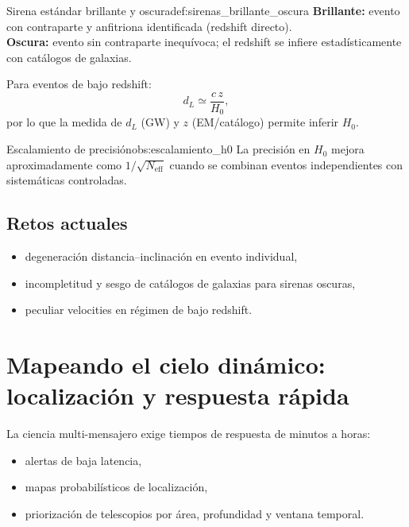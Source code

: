 \begin{definicion}{Sirena estándar brillante y oscura}{def:sirenas_brillante_oscura}
\textbf{Brillante:} evento con contraparte y anfitriona identificada (redshift directo). \\
\textbf{Oscura:} evento sin contraparte inequívoca; el redshift se infiere estadísticamente con catálogos de galaxias.
\end{definicion}

Para eventos de bajo redshift:
\begin{equation}
d_L \simeq \frac{c\,z}{H_0},
\end{equation}
por lo que la medida de $d_L$ (GW) y $z$ (EM/catálogo) permite inferir $H_0$.

\begin{observacion}{Escalamiento de precisión}{obs:escalamiento_h0}
La precisión en $H_0$ mejora aproximadamente como $1/\sqrt{N_{\mathrm{eff}}}$ cuando se combinan eventos independientes con sistemáticas controladas.
\end{observacion}

\subsection{Retos actuales}

\begin{itemize}[leftmargin=2em]
  \item degeneración distancia--inclinación en evento individual,
  \item incompletitud y sesgo de catálogos de galaxias para sirenas oscuras,
  \item peculiar velocities en régimen de bajo redshift.
\end{itemize}

\section{Mapeando el cielo dinámico: localización y respuesta rápida}
\label{sec:localizacion_respuesta_rapida}

La ciencia multi-mensajero exige tiempos de respuesta de minutos a horas:
\begin{itemize}[leftmargin=2em]
  \item alertas de baja latencia,
  \item mapas probabilísticos de localización,
  \item priorización de telescopios por área, profundidad y ventana temporal.
\end{itemize}

